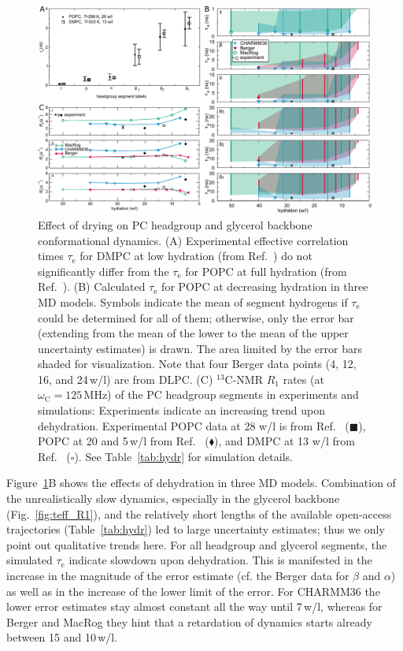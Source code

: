 \documentclass[journal=jcisd8,manuscript=article,layout=twocolumn]{achemso}
\begin{document}
\begin{figure}[ht!]
\centering
\includegraphics[width=\textwidth]{../Figs/hydration_2columns.pdf} 

\caption{Effect of drying on PC headgroup and glyc\-er\-ol backbone conformational dynamics.
(A) Experimental effective correlation times $\tau_\mathrm e$ for
DMPC at low hydration %
(from Ref.~)
do not significantly differ from the
$\tau_\mathrm e$ for POPC at full hydration (from Ref.~). %
(B) Calculated $\tau_\mathrm e$  for
POPC at decreasing hydration in three MD models.
Symbols indicate the mean of segment hydrogens
if $\tau_\mathrm{e}$ could be determined for all of them; otherwise, only the error bar
(extending from the mean of the lower to the mean of the upper uncertainty estimates) is drawn.
The area limited by the error bars shaded for visualization.
Note that four Berger data points (4, 12, 16, and 24\,w/l) are from DLPC.
(C) $^{13}$C-NMR $R_1$ rates (at $\omega_\mathrm C=125$\,MHz) of the PC headgroup segments
in experiments and simulations: Experiments indicate an increasing trend upon dehydration. Experimental POPC data at 28 w/l is from Ref.~ ($\blacksquare$), POPC at 20 and 5\,w/l from Ref.~ ($\blacklozenge$), and DMPC at 13 w/l from Ref.~ ($\square$). 
See Table~\ref{tab:hydr} for simulation details.}
\label{fig:hydration}
\end{figure}

Figure~\ref{fig:hydration}B shows the effects of dehydration in three MD models.
Combination of
the unrealistically slow dynamics, especially in the glycerol backbone (Fig.~\ref{fig:teff_R1}), and
the relatively short lengths of the available open-access trajectories %
(Table~\ref{tab:hydr})
led to large uncertainty estimates; %
thus we only point out qualitative trends here. For all headgroup and glycerol segments, the simulated  $\tau_\mathrm e$ indicate slowdown upon dehydration. This is manifested in the increase in the magnitude of the error estimate (cf. the Berger data for $\beta$ and $\alpha$) as well as in the increase of the lower limit of the error. 
For CHARMM36 the lower error estimates stay almost constant all the way until 7\,w/l, whereas for Berger and MacRog they hint that a retardation of dynamics starts already between 15 and 10\,w/l.
\end{document}
